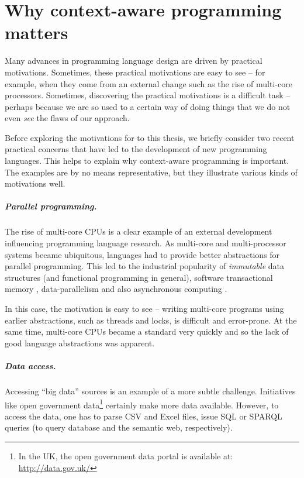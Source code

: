 \chapter{Why context-aware programming matters}
\label{ch:intro}

Many advances in programming language design are driven by practical motivations. Sometimes,
these practical motivations are easy to see -- for example, when they come from an external change
such as the rise of multi-core processors. Sometimes, discovering the practical motivations is a
difficult task -- perhaps because we are so used to a certain way of doing things that we do not
even \emph{see} the flaws of our approach.

Before exploring the motivations for to this thesis, we briefly consider two recent practical
concerns that have led to the development of new programming languages. This helps to explain why
context-aware programming is important. The examples are by no means representative, but they
illustrate various kinds of motivations well.

\paragraph{Parallel programming.}

The rise of multi-core CPUs is a clear example of an external development influencing
programming language research. As multi-core and multi-processor systems became ubiquitous,
languages had to provide better abstractions for parallel programming. This led to the industrial
popularity of \emph{immutable} data structures (and functional programming in general), software
transactional memory \cite{app-haskell-stm}, data-parallelism and also asynchronous
computing \cite{app-fsharp-async}.

In this case, the motivation is easy to see -- writing multi-core programs using earlier
abstractions, such as threads and locks, is difficult and error-prone. At the same time,
multi-core CPUs became a standard very quickly and so the lack of good language abstractions
was apparent.

\paragraph{Data access.}

Accessing ``big data'' sources is an example of a more subtle challenge. Initiatives like open
government data\footnote{In the UK, the open government data portal is available at: \url{http://data.gov.uk/}}
certainly make more data available. However, to access the data, one has to parse CSV and Excel files,
issue SQL or SPARQL queries (to query database and the semantic web, respectively).

